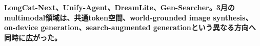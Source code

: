 \noindent\textbf{LongCat-Next、Unify-Agent、DreamLite、Gen-Searcher。3月のmultimodal領域は、共通token空間、world-grounded image synthesis、on-device generation、search-augmented generationという異なる方向へ同時に広がった。}\autocite{src-197775677c0d,src-abece2adf5a7,src-ac36472a8f09,src-b8369fd2c988}
